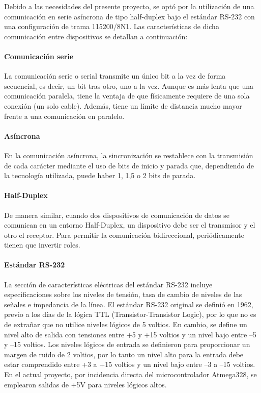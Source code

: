 Debido a las necesidades del presente proyecto, se optó por la utilización de una comunicación en serie asíncrona de tipo half-duplex bajo el estándar RS-232 con una configuración de trama 115200/8N1. Las características de dicha comunicación entre dispositivos se detallan a continuación:
\par
\paragraph*{Comunicación serie}
    La comunicación serie o serial transmite un único bit a la vez de forma secuencial, es decir, un bit tras otro, uno a la vez. Aunque es más lenta que una comunicación paralela, tiene la ventaja de que físicamente requiere de una sola conexión (un solo cable). Además, tiene un límite de distancia mucho mayor frente a una comunicación en paralelo.
    \par
    \paragraph*{Asíncrona}
En la comunicación asíncrona, la sincronización se restablece con la transmisión de cada carácter mediante el uso de bits de inicio y parada que, dependiendo de la tecnología utilizada, puede haber 1, 1,5 o 2 bits de parada.
\par
\paragraph*{Half-Duplex}
 De manera similar, cuando dos dispositivos de comunicación de datos se comunican en un entorno Half-Duplex, un dispositivo debe ser el transmisor y el otro el receptor. Para permitir la comunicación bidireccional, periódicamente tienen que invertir roles.    
 \par
 \paragraph*{Estándar RS-232}
La sección de características eléctricas del estándar RS-232 incluye especificaciones sobre los niveles de tensión, tasa de cambio de niveles de las señales e impedancia de la línea. El estándar RS-232 original se definió en 1962, previo a los días de la lógica TTL (Transistor-Transistor Logic), por lo que no es de extrañar que no utilice niveles lógicos de 5 voltios. En cambio, se define un nivel alto de salida con tensiones entre +5 y +15 voltios y un nivel bajo entre –5 y –15 voltios. Los niveles lógicos de entrada se definieron para proporcionar un margen de ruido de 2 voltios, por lo tanto un nivel alto para la entrada debe estar comprendido entre +3 a +15 voltios y un nivel bajo entre –3 a –15 voltios. En el actual proyecto, por incidencia directa del microcontrolador Atmega328, se emplearon salidas de +5V para niveles lógicos altos. 
\par
